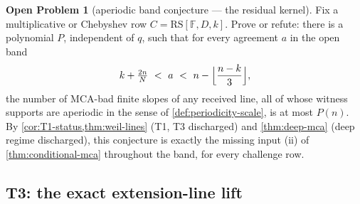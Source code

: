 \documentclass[11pt]{article}
\theoremstyle{definition}
\newtheorem{problem}[theorem]{Open Problem}
\theoremstyle{remark}
\newcommand{\F}{\mathbb{F}}
\newcommand{\RS}{\mathrm{RS}}
\begin{document}
\begin{problem}[aperiodic band conjecture --- the residual kernel]\label{prob:band}
Fix a multiplicative or Chebyshev row $C=\RS[\F,D,k]$. Prove or refute: there is a polynomial $P$, independent of $q$, such that for every agreement $a$ in the open band
\[
k+\tfrac{2n}N\ <\ a\ <\ n-\Bigl\lfloor\frac{n-k}3\Bigr\rfloor ,
\]
the number of MCA-bad finite slopes of any received line, all of whose witness supports are aperiodic in the sense of \cref{def:periodicity-scale}, is at most $P(n)$. By \cref{cor:T1-status,thm:weil-lines} \textup(T1, T3 discharged\textup) and \cref{thm:deep-mca} \textup(deep regime discharged\textup), this conjecture is exactly the missing input \textup{(ii)} of \cref{thm:conditional-mca} throughout the band, for every challenge row.
\end{problem}

\subsection{T3: the exact extension-line lift}\label{sec:discharge-T3}
\end{document}
